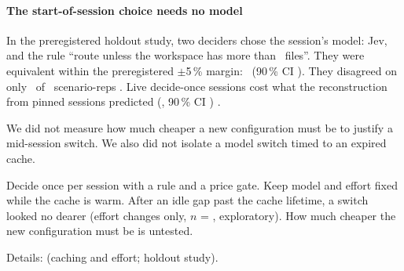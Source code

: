 \paragraph{The start-of-session choice needs no model} In the preregistered holdout study, two deciders chose the session's model: Jev,
and the rule ``route unless the workspace has more than \AoScopeFiles\ files''. They were equivalent within the
preregistered $\pm$5\,\% margin: \SHTwoRatio\X\ (90\,\% CI \SHTwoCINinety). They disagreed on only \SHTwoDisc\ of \SHTwoReps\
scenario-reps \prereg. Live decide-once sessions cost what the reconstruction from pinned sessions predicted
(\SHSixRatio\X, 90\,\% CI \SHSixCINinety) \prereg.

We did not measure how much cheaper a new configuration must be to justify a mid-session switch. We also did not
isolate a model switch timed to an expired cache.

\begin{keyidea}[title={For practitioners}]
Decide once per session with a rule and a price gate. Keep model and effort fixed while the cache is warm. After an idle gap past the
cache lifetime, a switch looked no dearer (effort changes only, $n$ = \CwLongN, exploratory). How much cheaper the
new configuration must be is untested.
\end{keyidea}

Details:  (caching and effort; holdout study).
